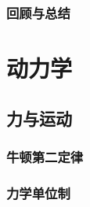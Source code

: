 \documentclass[color=purple,openany]{textbook-cn}
\begin{document}
\section{回顾与总结}

\begin{Point}
\lipsum[2]
\end{Point}

\begin{Case*}
\item \lipsum[1][3]
\item \lipsum[1][3]
\item \lipsum[1][3]
\item \lipsum[1][3]
\end{Case*}

\begin{Link}
\zhlipsum[1]
\end{Link}






\part{动力学}

\chaptersaying{\lipsum[1][7]}
\chapter{力与运动}


\begin{Block}[章节引入]
\lipsum[1-3]
\end{Block}


\section{牛顿第二定律}
\begin{Point}
\lipsum[2]
\end{Point}

\begin{Case}
\item \lipsum[1][3]
\item \lipsum[1][3]
\item \lipsum[1][3]
\item \lipsum[1][3]
\end{Case}

\begin{Link}
\zhlipsum[1]
\end{Link}




\section{力学单位制}
\begin{Point}
\lipsum[2]
\end{Point}
\end{document}
